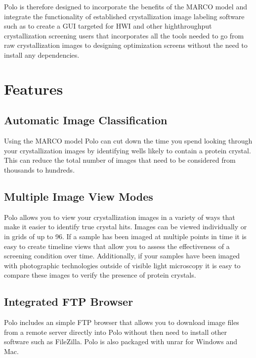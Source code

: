 \documentclass[letterpaper,10pt,english]{sphinxmanual}
\begin{document}
Polo is therefore designed to incorporate the benefits of the MARCO model
and integrate the functionality of established crystallization image
labeling software such as 
to create a GUI targeted for HWI and other high\sphinxhyphen{}throughput crystallization screening
users that incorporates all the tools needed to go from raw crystallization images
to designing optimization screens without the need to install any dependencies.


\section{Features}
\label{\detokenize{about:features}}

\subsection{Automatic Image Classification}
\label{\detokenize{about:automatic-image-classification}}
Using the MARCO model Polo can cut down the time you spend looking
through your crystallization images by identifying wells likely to
contain a protein crystal. This can reduce the total number of
images that need to be considered from thousands to hundreds.


\subsection{Multiple Image View Modes}
\label{\detokenize{about:multiple-image-view-modes}}
Polo allows you to view your crystallization images in a variety of
ways that make it easier to identify true crystal hits. Images can be
viewed individually or in grids of up to 96.
If a sample has been imaged at multiple points in time it is easy
to create timeline views that allow you to assess the effectiveness
of a screening condition over time. Additionally, if your samples
have been imaged with photographic technologies outside of visible
light microscopy it is easy to compare these images to verify
the presence of protein crystals.


\subsection{Integrated FTP Browser}
\label{\detokenize{about:integrated-ftp-browser}}
Polo includes an simple FTP browser that allows you to download image
files from a remote server directly into Polo without then need to
install other software such as FileZilla. Polo is also packaged with
unrar for Windows and Mac.
\end{document}

